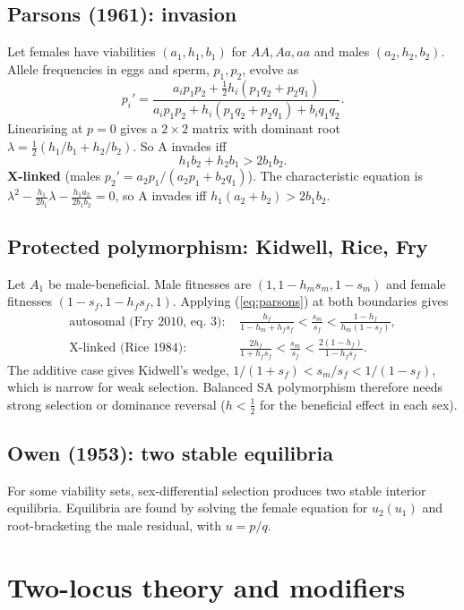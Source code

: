 \subsection{Parsons (1961): invasion}
Let females have viabilities $(a_1,h_1,b_1)$ for $AA,Aa,aa$ and males $(a_2,h_2,b_2)$. Allele frequencies in eggs and sperm, $p_1,p_2$, evolve as
\begin{equation}
p_i'=\frac{a_ip_1p_2+\tfrac12 h_i(p_1q_2+p_2q_1)}{a_ip_1p_2+h_i(p_1q_2+p_2q_1)+b_iq_1q_2}.
\end{equation}
Linearising at $p=0$ gives a $2\times2$ matrix with dominant root $\lambda=\tfrac12(h_1/b_1+h_2/b_2)$. So A invades iff
\begin{equation}h_1b_2+h_2b_1>2b_1b_2.\label{eq:parsons}\end{equation}
\textbf{X-linked} (males $p_2'=a_2p_1/(a_2p_1+b_2q_1)$). The characteristic equation is $\lambda^2-\frac{h_1}{2b_1}\lambda-\frac{h_1a_2}{2b_1b_2}=0$, so A invades iff $h_1(a_2+b_2)>2b_1b_2$.

\subsection{Protected polymorphism: Kidwell, Rice, Fry}
Let $A_1$ be male-beneficial. Male fitnesses are $(1,1-h_ms_m,1-s_m)$ and female fitnesses $(1-s_f,1-h_fs_f,1)$. Applying (\ref{eq:parsons}) at both boundaries gives
\begin{align}
\text{autosomal (Fry 2010, eq.\ 3): } &\frac{h_f}{1-h_m+h_fs_f}<\frac{s_m}{s_f}<\frac{1-h_f}{h_m(1-s_f)},\label{eq:fry}\\
\text{X-linked (Rice 1984): } &\frac{2h_f}{1+h_fs_f}<\frac{s_m}{s_f}<\frac{2(1-h_f)}{1-h_fs_f}.
\end{align}
The additive case gives Kidwell's wedge, $1/(1+s_f)<s_m/s_f<1/(1-s_f)$, which is narrow for weak selection. Balanced SA polymorphism therefore needs strong selection or dominance reversal ($h<\tfrac12$ for the beneficial effect in each sex).

\subsection{Owen (1953): two stable equilibria}
For some viability sets, sex-differential selection produces two stable interior equilibria. Equilibria are found by solving the female equation for $u_2(u_1)$ and root-bracketing the male residual, with $u=p/q$.

\section{Two-locus theory and modifiers}
